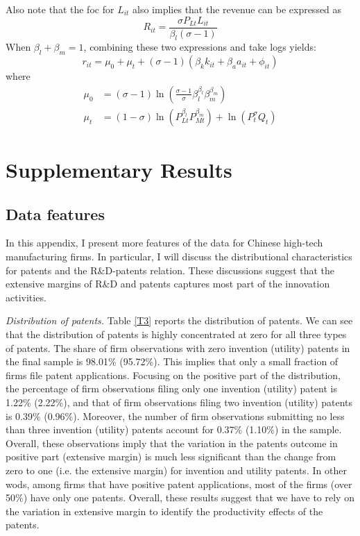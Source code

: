 \documentclass[11pt]{article}
\begin{document}
Also note that the foc for $L_{it}$ also implies that the revenue
can be expressed as
\begin{equation}
R_{it}=\frac{\sigma P_{Lt}L_{it}}{\beta_{l}\left(\sigma-1\right)}
\end{equation}
 When $\beta_{l}+\beta_{m}=1$, combining these two expressions and
take logs yields:
\begin{equation}
r_{it}=\mu_{0}+\mu_{t}+\left(\sigma-1\right)\left(\beta_{k}k_{it}+\beta_{a}a_{it}+\phi_{it}\right)
\end{equation}
where 
\begin{align}
\mu_{0} & =\left(\sigma-1\right)\ln\left(\frac{\sigma-1}{\sigma}\beta_{l}^{\beta_{l}}\beta_{m}^{\beta_{m}}\right)\\
\mu_{t} & =\left(1-\sigma\right)\ln\left(P_{Lt}^{\beta_{l}}P_{Mt}^{\beta_{m}}\right)+\ln\left(P_{t}^{\sigma}Q_{t}\right)
\end{align}

\section{Supplementary Results}
\subsection{Data features} \label{app_data_features}
In this appendix, I present more features of the
data for Chinese high-tech manufacturing firms. In particular, I will discuss the distributional characteristics for patents and the R\&D-patents relation. These discussions suggest that the extensive margins of R\&D and patents captures most part of the innovation activities. 

\textit{Distribution of patents.} Table \ref{T3} reports the distribution of patents. We can see that
the distribution of patents is highly concentrated at zero for all
three types of patents. The share of firm observations
with zero invention (utility) patents in the final sample is 98.01\%
(95.72\%). This implies that only a small fraction of firms file
patent applications. Focusing on the positive part of the distribution,
the percentage of firm observations filing only one invention (utility)
patent is 1.22\% (2.22\%), and that of firm observations filing two
invention (utility) patents is 0.39\% (0.96\%). Moreover, the number
of firm observations submitting no less than three invention (utility)
patents account for 0.37\% (1.10\%) in the sample. Overall,
these observations imply that the variation in the patents outcome
in positive part (extensive margin) is much less significant than
the change from zero to one (i.e. the extensive margin) for invention
and utility patents. In other wods, among firms that have positive
patent applications, most of the firms (over 50\%) have only one patents. Overall, these results suggest that we have to rely on the variation in extensive margin to identify the productivity effects of the patents.
\end{document}
